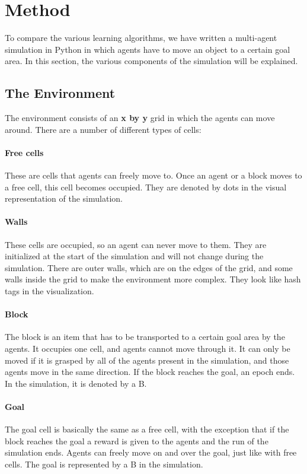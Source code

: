 \section{Method}
To compare the various learning algorithms, we have written a multi-agent simulation in Python in which agents have to move an object to a certain goal area. In this section, the various components of the simulation will be explained.
\subsection{The Environment}
The environment consists of an \textbf{x by y} grid in which the agents can move around. There are a number of different types of cells:
\paragraph{Free cells}
These are cells that agents can freely move to. Once an agent or a block moves to a free cell, this cell becomes occupied. They are denoted by dots in the visual representation of the simulation.
\paragraph{Walls}
These cells are occupied, so an agent can never move to them. They are initialized at the start of the simulation and will not change during the simulation. There are outer walls, which are on the edges of the grid, and some walls inside the grid to make the environment more complex. They look like hash tags in the visualization.
\paragraph{Block}
The block is an item that has to be transported to a certain goal area by the agents. It occupies one cell, and agents cannot move through it. It can only be moved if it is grasped by all of the agents present in the simulation, and those agents move in the same direction. If the block reaches the goal, an epoch ends. In the simulation, it is denoted by a B.
\paragraph{Goal}
The goal cell is basically the same as a free cell, with the exception that if the block reaches the goal a reward is given to the agents and the run of the simulation ends. Agents can freely move on and over the goal, just like with free cells. The goal is represented by a B in the simulation.
